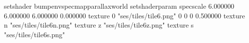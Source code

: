 setshader bumpenvspecmapparallaxworld
setshaderparam specscale 6.000000 6.000000 6.000000 0.000000
texture 0 "ses/tiles/tile6.png" 0 0 0 0.500000
texture n "ses/tiles/tile6n.png"
texture z "ses/tiles/tile6z.png"
texture s "ses/tiles/tile6s.png"


